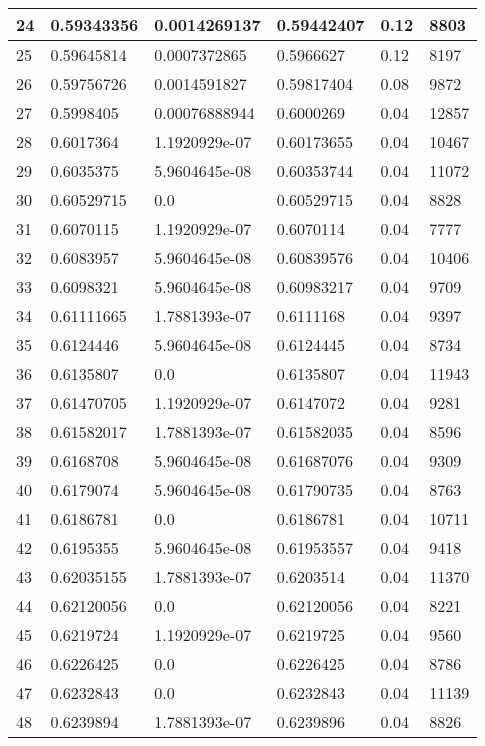 \begin{longtable}{|l|l|l|l|l|l|}
24 & 0.59343356 & 0.0014269137 & 0.59442407 & 0.12 & 8803 \\ \hline 
25 & 0.59645814 & 0.0007372865 & 0.5966627 & 0.12 & 8197 \\ \hline 
26 & 0.59756726 & 0.0014591827 & 0.59817404 & 0.08 & 9872 \\ \hline 
27 & 0.5998405 & 0.00076888944 & 0.6000269 & 0.04 & 12857 \\ \hline 
28 & 0.6017364 & 1.1920929e-07 & 0.60173655 & 0.04 & 10467 \\ \hline 
29 & 0.6035375 & 5.9604645e-08 & 0.60353744 & 0.04 & 11072 \\ \hline 
30 & 0.60529715 & 0.0 & 0.60529715 & 0.04 & 8828 \\ \hline 
31 & 0.6070115 & 1.1920929e-07 & 0.6070114 & 0.04 & 7777 \\ \hline 
32 & 0.6083957 & 5.9604645e-08 & 0.60839576 & 0.04 & 10406 \\ \hline 
33 & 0.6098321 & 5.9604645e-08 & 0.60983217 & 0.04 & 9709 \\ \hline 
34 & 0.61111665 & 1.7881393e-07 & 0.6111168 & 0.04 & 9397 \\ \hline 
35 & 0.6124446 & 5.9604645e-08 & 0.6124445 & 0.04 & 8734 \\ \hline 
36 & 0.6135807 & 0.0 & 0.6135807 & 0.04 & 11943 \\ \hline 
37 & 0.61470705 & 1.1920929e-07 & 0.6147072 & 0.04 & 9281 \\ \hline 
38 & 0.61582017 & 1.7881393e-07 & 0.61582035 & 0.04 & 8596 \\ \hline 
39 & 0.6168708 & 5.9604645e-08 & 0.61687076 & 0.04 & 9309 \\ \hline 
40 & 0.6179074 & 5.9604645e-08 & 0.61790735 & 0.04 & 8763 \\ \hline 
41 & 0.6186781 & 0.0 & 0.6186781 & 0.04 & 10711 \\ \hline 
42 & 0.6195355 & 5.9604645e-08 & 0.61953557 & 0.04 & 9418 \\ \hline 
43 & 0.62035155 & 1.7881393e-07 & 0.6203514 & 0.04 & 11370 \\ \hline 
44 & 0.62120056 & 0.0 & 0.62120056 & 0.04 & 8221 \\ \hline 
45 & 0.6219724 & 1.1920929e-07 & 0.6219725 & 0.04 & 9560 \\ \hline 
46 & 0.6226425 & 0.0 & 0.6226425 & 0.04 & 8786 \\ \hline 
47 & 0.6232843 & 0.0 & 0.6232843 & 0.04 & 11139 \\ \hline 
48 & 0.6239894 & 1.7881393e-07 & 0.6239896 & 0.04 & 8826 \\ \hline 

\end{longtable}
